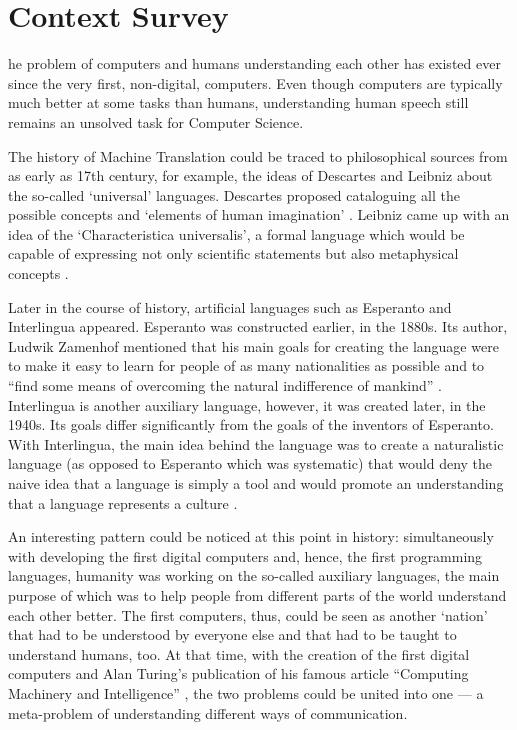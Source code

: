 \let\textcircled=\pgftextcircled
\chapter{Context Survey}
\label{chap:context-survey}

he problem of computers and humans understanding each other has existed ever since the very first, non-digital, computers. Even though computers are typically much better at some tasks than humans, understanding human speech still remains an unsolved task for Computer Science. 

The history of Machine Translation could be traced to philosophical sources from as early as 17th century, for example, the ideas of Descartes and Leibniz about the so-called `universal' languages. Descartes proposed cataloguing all the possible concepts and `elements of human imagination' \cite{descartes}. Leibniz came up with an idea of the `Characteristica universalis', a formal language which would be capable of expressing not only scientific statements but also metaphysical concepts \cite{leibniz}. 

Later in the course of history, artificial languages such as Esperanto and Interlingua appeared. Esperanto was constructed earlier, in the 1880s. Its author, Ludwik Zamenhof mentioned that his main goals for creating the language were to make it easy to learn for people of as many nationalities as possible and to ``find some means of overcoming the natural indifference of mankind'' \cite{zamenhof1911international}. Interlingua is another auxiliary language, however, it was created later, in the 1940s. Its goals differ significantly from the goals of the inventors of Esperanto. With Interlingua, the main idea behind the language was to create a naturalistic language (as opposed to Esperanto which was systematic) that would deny the naive idea that a language is simply a tool and would promote an understanding that a language represents a culture \cite{gode1951interlingua}.

An interesting pattern could be noticed at this point in history: simultaneously with developing the first digital computers and, hence, the first programming languages, humanity was working on the so-called auxiliary languages, the main purpose of which was to help people from different parts of the world understand each other better. The first computers, thus, could be seen as another `nation' that had to be understood by everyone else and that had to be taught to understand humans, too. At that time, with the creation of the first digital computers and Alan Turing's publication of his famous article ``Computing Machinery and Intelligence'' \cite{turing1950computing}, the two problems could be united into one --- a meta-problem of understanding different ways of communication.


